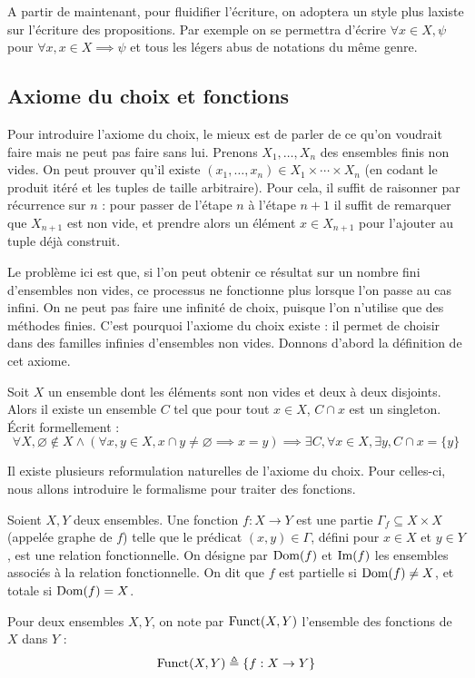 \begin{notation}
  A partir de maintenant, pour fluidifier l'écriture, on adoptera un style plus
  laxiste sur l'écriture des propositions. Par exemple on se permettra d'écrire
  $\forall x \in X, \psi$ pour $\forall x, x\in X \implies \psi$ et tous les
  légers abus de notations du même genre.
\end{notation}

\subsection{Axiome du choix et fonctions}

Pour introduire l'axiome du choix, le mieux est de parler de ce qu'on voudrait
faire mais ne peut pas faire sans lui. Prenons $X_1,\ldots,X_n$ des ensembles
finis non vides. On peut prouver qu'il existe
$(x_1,\ldots,x_n)\in X_1\times\cdots\times X_n$ (en codant le produit itéré et
les tuples de taille arbitraire). Pour cela, il suffit de raisonner par
récurrence sur $n$ : pour passer de l'étape $n$ à l'étape $n+1$ il suffit de
remarquer que $X_{n+1}$ est non vide, et prendre alors un élément $x\in X_{n+1}$
pour l'ajouter au tuple déjà construit.

Le problème ici est que, si l'on peut obtenir ce résultat sur un nombre fini
d'ensembles non vides, ce processus ne fonctionne plus lorsque l'on passe au cas
infini. On ne peut pas faire une infinité de choix, puisque l'on n'utilise que
des méthodes finies. C'est pourquoi l'axiome du choix existe : il permet de
choisir dans des familles infinies d'ensembles non vides. Donnons d'abord la
définition de cet axiome.

\begin{axiom}[Choix]
  Soit $X$ un ensemble dont les éléments sont non vides et deux à deux
  disjoints. Alors il existe un ensemble $C$ tel que pour tout $x\in X$,
  $C\cap x$ est un singleton. \'Ecrit formellement :
  \[
  \forall X, \varnothing\notin X \land (\forall x,y \in X, x \cap y \neq
  \varnothing \implies x = y)
  \implies \exists C, \forall x \in X, \exists y, C \cap x = \{y\}
  \]
\end{axiom}

Il existe plusieurs reformulation naturelles de l'axiome du choix. Pour
celles-ci, nous allons introduire le formalisme pour traiter des fonctions.

\begin{definition}[Fonction]
  Soient $X,Y$ deux ensembles. Une fonction $f : X \to Y$ est une partie
  $\Gamma_f\subseteq X \times X$ (appelée graphe de $f$)  telle que le prédicat
  $(x,y)\in \Gamma$, défini pour $x\in X$ et $y\in Y$, est une relation
  fonctionnelle. On désigne par $\operatorname{Dom}(f)$ et $\operatorname{Im}(f)$ les ensembles associés à
  la relation fonctionnelle. On dit que $f$ est partielle si $\operatorname{Dom}(f) \neq X$,
  et totale si $\operatorname{Dom}(f) = X$.

  Pour deux ensembles $X,Y$, on note par $\operatorname{Funct}(X,Y)$ l'ensemble des fonctions
  de $X$ dans $Y$ :
  \[\operatorname{Funct}(X,Y) \triangleq \{f : X \to Y\}\]
\end{definition}

